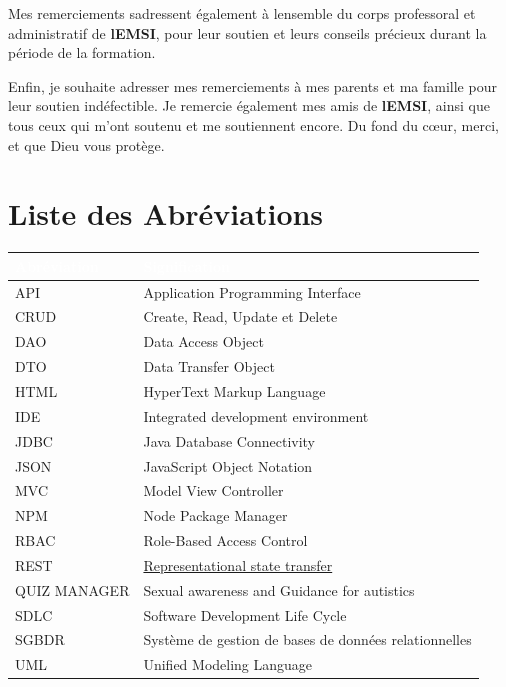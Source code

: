 \documentclass[12pt,a4paper,twoside]{report}
\begin{document}
Mes remerciements s\textquotesingle adressent également à
l\textquotesingle ensemble du corps professoral et administratif de
\textbf{l\textquotesingle EMSI}, pour leur soutien et leurs conseils
précieux durant la période de la formation.

Enfin, je souhaite adresser mes remerciements à mes parents et ma
famille pour leur soutien indéfectible. Je remercie également mes amis
de \textbf{l\textquotesingle EMSI}, ainsi que tous ceux qui m'ont
soutenu et me soutiennent encore. Du fond du cœur, merci, et que Dieu
vous protège.

\chapter{Liste des Abréviations}

\begin{longtable}[]{@{}
  >{\raggedright\arraybackslash}p{}
  >{\raggedright\arraybackslash}p{}@{}}
\toprule()
\rowcolor{capgeminiblue}
\textcolor{white}{\textbf{Abréviation}} & \textcolor{white}{\textbf{Signification}} \\
\midrule()
\endhead
\rowcolor{lightgray}
API & Application Programming Interface \\
CRUD & Create, Read, Update et Delete \\
\rowcolor{lightgray}
DAO & Data Access Object \\
DTO & Data Transfer Object \\
\rowcolor{lightgray}
HTML & HyperText Markup Language \\
IDE & Integrated development environment \\
\rowcolor{lightgray}
JDBC & Java Database Connectivity \\
JSON & JavaScript Object Notation \\
\rowcolor{lightgray}
MVC & Model View Controller \\
NPM & Node Package Manager \\
\rowcolor{lightgray}
RBAC & Role-Based Access Control \\
REST &
\href{https://en.wikipedia.org/wiki/Representational_state_transfer}{Representational
state transfer} \\
\rowcolor{lightgray}
QUIZ MANAGER & Sexual awareness and Guidance for autistics \\
SDLC & Software Development Life Cycle \\
\rowcolor{lightgray}
SGBDR & Système de gestion de bases de données relationnelles \\
UML & Unified Modeling Language \\
\bottomrule()
\end{longtable}
\end{document}
